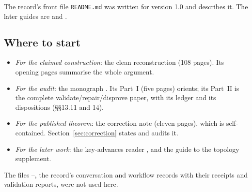 The record's front file \texttt{README.md} was written for version 1.0 and describes it. The later guides are  and .

\subsection{Where to start}

\begin{itemize}
\item \emph{For the claimed construction}: the clean reconstruction  (108 pages). Its opening pages summarise the whole argument.
\item \emph{For the audit}: the monograph . Its Part~I (five pages) orients; its Part~II is the complete validate/repair/disprove paper, with its ledger and its dispositions (§§13.11 and 14).
\item \emph{For the published theorem}: the correction note  (eleven pages), which is self-contained. Section~\ref{sec:correction} states and audits it.
\item \emph{For the later work}: the key-advances reader , and the guide  to the topology supplement.
\end{itemize}

The files --, the record's conversation and workflow records with their receipts and validation reports, were not used here.
